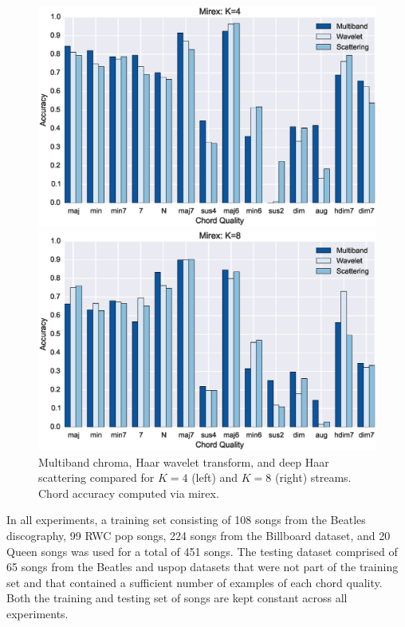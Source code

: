 \documentclass{article}
\begin{document}
\begin{figure}[h!]
\centering
\begin{minipage}{\columnwidth}
	\centering
	\includegraphics[width=1.0\columnwidth]{figs/mirex4.eps}
\end{minipage}
\begin{minipage}{\columnwidth}
	\centering
	\includegraphics[width=1.0\columnwidth]{figs/mirex8.eps}
\end{minipage}
\caption{Multiband chroma, Haar wavelet transform, and deep Haar scattering compared for $K=4$ (left) and $K=8$ (right) streams. Chord accuracy computed via mirex.}
\label{fig:mirex}
\end{figure}

In all experiments, a training set consisting of 108 songs from the Beatles
discography, 99 RWC pop songs, 224 songs from the Billboard dataset, and 20 Queen songs was used for a total of 451 songs.
The testing dataset comprised of 65 songs from the Beatles and uspop datasets that were not part
of the training set and that contained a sufficient number of examples of each chord quality. 
Both the training and testing set of songs are kept constant across all experiments.
	
\end{document}
